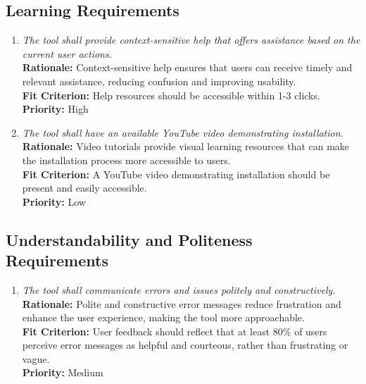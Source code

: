 \documentclass[12pt]{article}
\begin{document}
\subsection{Learning Requirements}
\begin{enumerate}[label=UHR-LRN \arabic*., wide=0pt, leftmargin=*]
    \item \emph{The tool shall provide context-sensitive help that offers assistance based on the current user actions.}\\
    {\bf Rationale:} Context-sensitive help ensures that users can receive timely and relevant assistance, reducing confusion and improving usability.\\
    {\bf Fit Criterion:} Help resources should be accessible within 1-3 clicks.\\
    {\bf Priority:} High
    \item \emph{The tool shall have an available YouTube video demonstrating installation.}\\
    {\bf Rationale:} Video tutorials provide visual learning resources that can make the installation process more accessible to users.\\
    {\bf Fit Criterion:} A YouTube video demonstrating installation should be present and easily accessible.\\
    {\bf Priority:} Low
\end{enumerate}
\subsection{Understandability and Politeness Requirements}
\begin{enumerate}[label=UHR-UPL \arabic*., wide=0pt, leftmargin=*]
    \item \emph{The tool shall communicate errors and issues politely and constructively.}\\
    {\bf Rationale:} Polite and constructive error messages reduce frustration and enhance the user experience, making the tool more approachable.\\
    {\bf Fit Criterion:} User feedback should reflect that at least 80\% of users perceive error messages as helpful and courteous, rather than frustrating or vague.\\
    {\bf Priority:} Medium
\end{enumerate}
\end{document}
